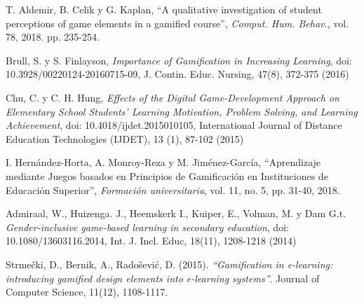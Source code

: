 \begin{thebibliography}{9}

        T. Aldemir, B. Celik y G. Kaplan,
        ``A qualitative investigation of student perceptions of game elements in a gamified course'',
        {\it Comput. Hum. Behav.}, vol. 78, 2018. pp. 235-254.

        Brull, S. y S. Finlayson,
        {\it Importance of Gamification in Increasing Learning},
        doi: 10.3928/00220124-20160715-09,
        J. Contin. Educ. Nursing, 47(8), 372-375 (2016)

        Chu, C. y C. H. Hung,
        {\it Effects of the Digital Game-Development Approach on Elementary School Students’
        Learning Motivation, Problem Solving, and Learning Achievement}, doi: 10.4018/ijdet.2015010105,
        International Journal of Distance Education Technologies (IJDET), 13 (1), 87-102 (2015)

        I. Hernández-Horta, A. Monroy-Reza y M. Jiménez-García,
        ``Aprendizaje mediante Juegos basados en Principios de Gamificación en Instituciones de Educación Superior'',
        {\it Formación universitaria}, vol. 11, no. 5, pp. 31-40, 2018.

        Admiraal, W., Huizenga. J., Heemskerk I., Kuiper, E., Volman, M. y Dam G.t.
        {\it Gender-inclusive game-based learning in secondary education},
        doi: 10.1080/13603116.2014, Int. J. Incl. Educ, 18(11), 1208-1218 (2014)


        Strmečki, D., Bernik, A., Radošević, D. (2015).
        {\it ``Gamification in e-learning: introducing gamified design elements into e-learning systems''}.
        Journal of Computer Science, 11(12), 1108-1117.


\end{thebibliography}
